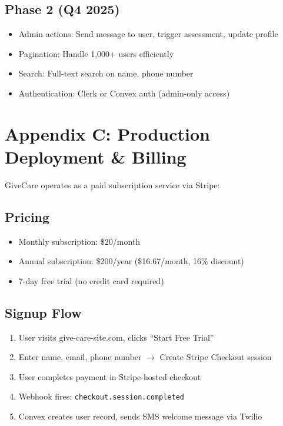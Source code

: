\documentclass{article}%
\begin{document}
\subsection*{Phase 2 (Q4 2025)}
\begin{itemize}
    \item Admin actions: Send message to user, trigger assessment, update profile
    \item Pagination: Handle 1,000+ users efficiently
    \item Search: Full-text search on name, phone number
    \item Authentication: Clerk or Convex auth (admin-only access)
\end{itemize}
%
\section*{Appendix C: Production Deployment \& Billing}

GiveCare operates as a paid subscription service via Stripe:

\subsection*{Pricing}
\begin{itemize}
    \item Monthly subscription: \$20/month
    \item Annual subscription: \$200/year (\$16.67/month, 16\% discount)
    \item 7-day free trial (no credit card required)
\end{itemize}

\subsection*{Signup Flow}
\begin{enumerate}
    \item User visits give-care-site.com, clicks ``Start Free Trial''
    \item Enter name, email, phone number $\rightarrow$ Create Stripe Checkout session
    \item User completes payment in Stripe-hosted checkout
    \item Webhook fires: \texttt{checkout.session.completed}
    \item Convex creates user record, sends SMS welcome message via Twilio
\end{enumerate}
\end{document}
